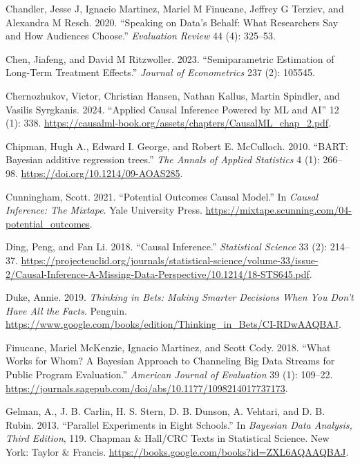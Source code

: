 \documentclass[
  letterpaper,
  DIV=11,
  numbers=noendperiod]{scrreprt}
\newlength{\cslhangindent}
\newenvironment{CSLReferences}[2] %
 {\begin{list}{}{%
  \setlength{\itemindent}{0pt}
  \setlength{\leftmargin}{0pt}
  \setlength{\parsep}{0pt}
  \ifodd #1
   \setlength{\leftmargin}{\cslhangindent}
   \setlength{\itemindent}{-1\cslhangindent}
  \fi
  \setlength{\itemsep}{#2\baselineskip}}}
 {\end{list}}
\begin{document}
\begin{CSLReferences}{1}{0}
Chandler, Jesse J, Ignacio Martinez, Mariel M Finucane, Jeffrey G
Terziev, and Alexandra M Resch. 2020. {``Speaking on Data's Behalf: What
Researchers Say and How Audiences Choose.''} \emph{Evaluation Review} 44
(4): 325--53.

Chen, Jiafeng, and David M Ritzwoller. 2023. {``Semiparametric
Estimation of Long-Term Treatment Effects.''} \emph{Journal of
Econometrics} 237 (2): 105545.

Chernozhukov, Victor, Christian Hansen, Nathan Kallus, Martin Spindler,
and Vasilis Syrgkanis. 2024. {``Applied Causal Inference Powered by ML
and AI''} 12 (1): 338.
\url{https://causalml-book.org/assets/chapters/CausalML_chap_2.pdf}.

Chipman, Hugh A., Edward I. George, and Robert E. McCulloch. 2010.
{``{BART: Bayesian additive regression trees}.''} \emph{The Annals of
Applied Statistics} 4 (1): 266--98.
\url{https://doi.org/10.1214/09-AOAS285}.

Cunningham, Scott. 2021. {``Potential Outcomes Causal Model.''} In
\emph{Causal Inference: The Mixtape}. Yale University Press.
\url{https://mixtape.scunning.com/04-potential_outcomes}.

Ding, Peng, and Fan Li. 2018. {``Causal Inference.''} \emph{Statistical
Science} 33 (2): 214--37.
\url{https://projecteuclid.org/journals/statistical-science/volume-33/issue-2/Causal-Inference-A-Missing-Data-Perspective/10.1214/18-STS645.pdf}.

Duke, Annie. 2019. \emph{Thinking in Bets: Making Smarter Decisions When
You Don't Have All the Facts}. Penguin.
\url{https://www.google.com/books/edition/Thinking_in_Bets/CI-RDwAAQBAJ}.

Finucane, Mariel McKenzie, Ignacio Martinez, and Scott Cody. 2018.
{``What Works for Whom? A Bayesian Approach to Channeling Big Data
Streams for Public Program Evaluation.''} \emph{American Journal of
Evaluation} 39 (1): 109--22.
\url{https://journals.sagepub.com/doi/abs/10.1177/1098214017737173}.

Gelman, A., J. B. Carlin, H. S. Stern, D. B. Dunson, A. Vehtari, and D.
B. Rubin. 2013. {``Parallel Experiments in Eight Schools.''} In
\emph{Bayesian Data Analysis, Third Edition}, 119. Chapman \& Hall/CRC
Texts in Statistical Science. New York: Taylor \& Francis.
\url{https://books.google.com/books?id=ZXL6AQAAQBAJ}.


\end{CSLReferences}
\end{document}
